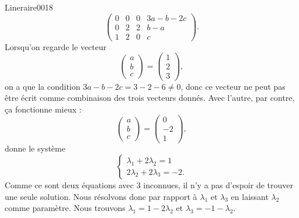 \begin{corrige}{Lineraire0018}
	\begin{equation}
		\left(\begin{array}{ccc|c}
			 0	&	0	&	0	&	3a-b-2c	\\
			  0	&	2	&	2	&	b-a\\
			   1	&	2	&	0	&	c	 
		   \end{array}\right).
	\end{equation}
	Lorsqu'on regarde le vecteur
	\begin{equation}
		\begin{pmatrix}
			a	\\ 
			b	\\ 
			c	
		\end{pmatrix}
		=
		\begin{pmatrix}
			1	\\ 
			2	\\ 
			3	
		\end{pmatrix},
	\end{equation}
	on a que la condition $3a-b-2c=3-2-6\neq 0$, donc ce vecteur ne peut pas être écrit comme combinaison des trois vecteurs donnés. Avec l'autre, par contre, ça fonctionne mieux :
	\begin{equation}
		\begin{pmatrix}
			a	\\ 
			b	\\ 
			c	
		\end{pmatrix}=
		\begin{pmatrix}
			0	\\ 
			-2	\\ 
			1	
		\end{pmatrix},
	\end{equation}
	donne le système
	\begin{equation}
		\left\{
		\begin{array}{ll}
			\lambda_1+2\lambda_2=1\\
			2 \lambda_2+2\lambda_3=-2.
		\end{array}
		\right.
	\end{equation}
	Comme ce sont deux équations avec 3 inconnues, il n'y a pas d'espoir de trouver une seule solution. Nous résolvons donc par rapport à $\lambda_1$ et $\lambda_3$ en laissant $\lambda_2$ comme paramètre. Nous trouvons $\lambda_1=1-2\lambda_2$ et $\lambda_3=-1-\lambda_2$.


\end{corrige}
